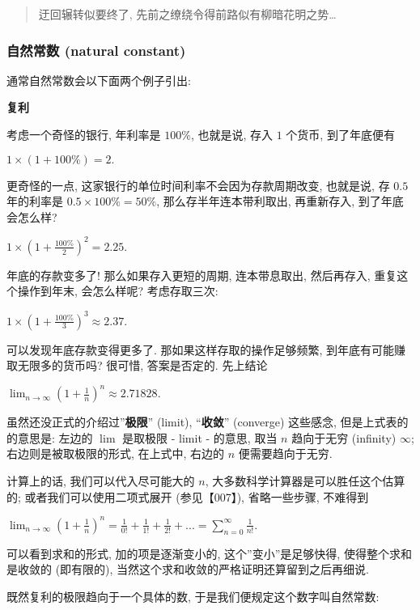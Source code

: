 \begin{quote}
迂回辗转似要终了, 先前之缭绕令得前路似有柳暗花明之势\ldots{}
\end{quote}

\hypertarget{ux81eaux7136ux5e38ux6570-natural-constant}{%
\subsubsection{自然常数 (natural
constant)}\label{ux81eaux7136ux5e38ux6570-natural-constant}}

通常自然常数会以下面两个例子引出:

\textbf{复利}

考虑一个奇怪的银行, 年利率是 \(100\%\), 也就是说, 存入 \(1\) 个货币,
到了年底便有

\(1\times(1+100\%)=2.\)

更奇怪的一点, 这家银行的单位时间利率不会因为存款周期改变, 也就是说, 存
\(0.5\) 年的利率是 \(0.5\times100\%=50\%\), 那么存半年连本带利取出,
再重新存入, 到了年底会怎么样?

\(1\times\left(1+\frac{100\%}{2}\right)^2=2.25.\)

年底的存款变多了! 那么如果存入更短的周期, 连本带息取出, 然后再存入,
重复这个操作到年末, 会怎么样呢? 考虑存取三次:

\(1\times\left(1+\frac{100\%}{3}\right)^3\approx2.37\).

可以发现年底存款变得更多了. 那如果这样存取的操作足够频繁,
到年底有可能赚取无限多的货币吗? 很可惜, 答案是否定的. 先上结论

\(\lim_{n\rightarrow\infty}\left(1+\frac{1}{n}\right)^n\approx2.71828.\)

虽然还没正式的介绍过''\textbf{极限}'' (limit), ``\textbf{收敛}''
(converge) 这些感念, 但是上式表的的意思是: 左边的 \(\lim\) 是取极限 -
limit - 的意思, 取当 \(n\) 趋向于无穷 (infinity) \(\infty\);
右边则是被取极限的形式, 在上式中, 右边的 \(n\) 便需要趋向于无穷.

计算上的话, 我们可以代入尽可能大的 \(n\),
大多数科学计算器是可以胜任这个估算的; 或者我们可以使用二项式展开
(参见【007】), 省略一些步骤, 不难得到

\(\lim_{n\rightarrow\infty}\left(1+\frac{1}{n}\right)^n=\frac{1}{0!}+\frac{1}{1!}+\frac{1}{2!}+...=\sum_{n=0}^\infty\frac{1}{n!}.\)

可以看到求和的形式, 加的项是逐渐变小的, 这个''变小''是足够快得,
使得整个求和是收敛的 (即有限的),
当然这个求和收敛的严格证明还算留到之后再细说.

既然复利的极限趋向于一个具体的数, 于是我们便规定这个数字叫自然常数:

